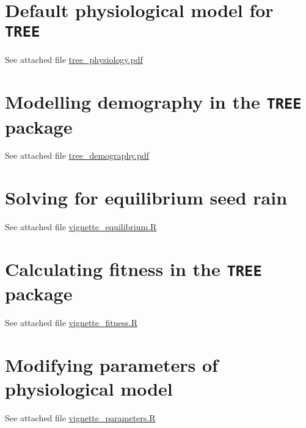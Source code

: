 \documentclass[a4paper,11pt]{article}
\begin{document}
\clearpage

\begin{appendices}\label{sec:appendices}

\section{Default physiological model for \texttt{TREE}}\label{sec:FFW16}

See attached file \url{tree_physiology.pdf}

\section{Modelling demography in the \texttt{TREE} package}\label{sec:demography}

See attached file \url{tree_demography.pdf}

\section{Solving for equilibrium seed rain}\label{sec:seed}

See attached file \url{vignette_equilibrium.R}

\section{Calculating fitness in the \texttt{TREE} package}\label{sec:fitness}

See attached file \url{vignette_fitness.R}

\section{Modifying parameters of physiological model}\label{sec:parameters}

See attached file \url{vignette_parameters.R}

\end{appendices}
\end{document}
